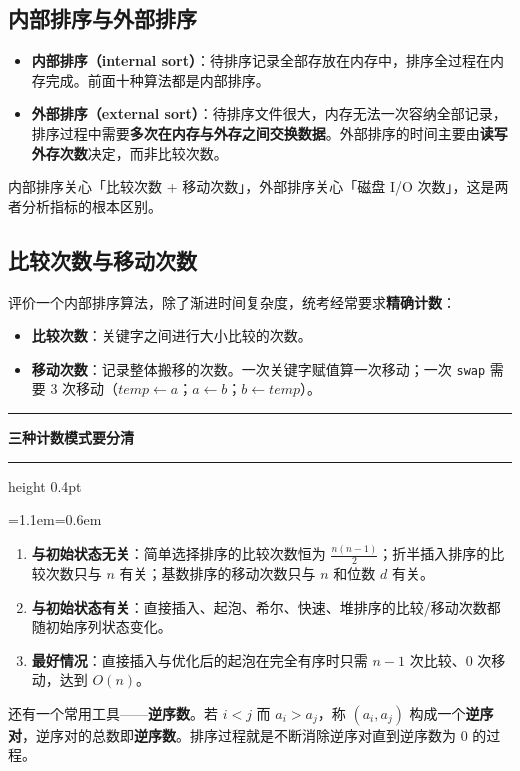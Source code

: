 \documentclass[11pt,openany,UTF8]{ctexbook}
\newcommand{\callouthead}[2]{%
  \par\addvspace{7pt}\noindent
  {\color{#1}\rule[-0.15em]{3pt}{1.05em}}\hspace{0.5em}%
  {\bfseries\color{#1}#2}\par\nobreak\vspace{-0.35em}%
  {\color{rulesep}\hrule height 0.4pt}\nobreak\vspace{0.45em}%
  \begingroup\small\setlength{\parindent}{0pt}%
  \leftskip=1.1em\rightskip=0.6em\noindent\ignorespaces}
\newcommand{\calloutend}{\par\endgroup\addvspace{7pt}}
\newenvironment{callkey}[1]{\callouthead{keybar}{#1}}{\calloutend}
\begin{document}
\subsection{内部排序与外部排序}

\begin{itemize}
\item \textbf{内部排序（internal sort）}：待排序记录全部存放在内存中，排序全过程在内存完成。前面十种算法都是内部排序。
\item \textbf{外部排序（external sort）}：待排序文件很大，内存无法一次容纳全部记录，排序过程中需要\textbf{多次在内存与外存之间交换数据}。外部排序的时间主要由\textbf{读写外存次数}决定，而非比较次数。
\end{itemize}
内部排序关心「比较次数 + 移动次数」，外部排序关心「磁盘 I/O 次数」，这是两者分析指标的根本区别。

\subsection{比较次数与移动次数}

评价一个内部排序算法，除了渐进时间复杂度，统考经常要求\textbf{精确计数}：

\begin{itemize}
\item \textbf{比较次数}：关键字之间进行大小比较的次数。
\item \textbf{移动次数}：记录整体搬移的次数。一次关键字赋值算一次移动；一次 \texttt{swap} 需要 3 次移动（$temp\leftarrow a$；$a\leftarrow b$；$b\leftarrow temp$）。
\end{itemize}
\begin{callkey}{三种计数模式要分清}
\begin{enumerate}
\item \textbf{与初始状态无关}：简单选择排序的比较次数恒为 $\frac{n(n-1)}{2}$；折半插入排序的比较次数只与 $n$ 有关；基数排序的移动次数只与 $n$ 和位数 $d$ 有关。
\item \textbf{与初始状态有关}：直接插入、起泡、希尔、快速、堆排序的比较/移动次数都随初始序列状态变化。
\item \textbf{最好情况}：直接插入与优化后的起泡在完全有序时只需 $n-1$ 次比较、0 次移动，达到 $O(n)$。
\end{enumerate}
\end{callkey}

还有一个常用工具——\textbf{逆序数}。若 $i<j$ 而 $a_i>a_j$，称 $(a_i,a_j)$ 构成一个\textbf{逆序对}，逆序对的总数即\textbf{逆序数}。排序过程就是不断消除逆序对直到逆序数为 0 的过程。
\end{document}
